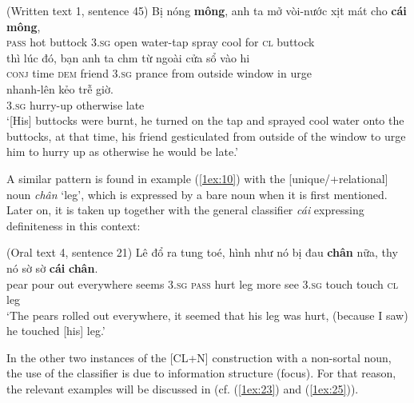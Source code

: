 \documentclass[output=paper]{langsci/langscibook}
\begin{document}
\begin{exe}
\ex\label{1ex:9}
(Written text 1, sentence 45)
\exi{}
\gll Bị         nóng   {\textbf{mông}},    {anh ta}  mở     vòi-nước    xịt      mát   cho   {\textbf{cái}}    {\textbf{mông}}, \\
{\textsc{pass}}   hot      buttock  {\textsc{3.sg}}    open   water-tap   spray cool  for     {\textsc{cl}}   buttock  \\
\glt 
\exi{}
\gll thì        lúc     đó,      bạn     {anh ta}   ch{\daob}m     từ      ngoài    {cửa sổ}    vào   h{\dao}i \\
{\textsc{conj}}  time   {\textsc{dem}}  friend  {\textsc{3.sg}}     prance   from outside  window  in     urge  \\
\glt 
\vspace*{-1mm}
\exi{} 
  nhanh-lên  kẻo           {trễ giờ}.  \\
3.{\textsc{sg}}    hurry-up    otherwise  late \\
\glt `[His] buttocks were burnt, he turned on the tap and sprayed cool water onto the buttocks, at that time, his friend gesticulated from outside of the window to urge him to hurry up as otherwise he would be late.'
\end{exe}

A similar pattern is found in example (\ref{1ex:10}) with the [\minus unique/+relational] noun {\emph{chân}} `leg', which is expressed by a bare noun when it is first mentioned. Later on, it is taken up together with the general classifier {\emph{cái}} expressing definiteness in this context:

\begin{exe}
\ex\label{1ex:10}
(Oral text 4, sentence 21) 
\exi{}
\gll Lê    đổ    ra    {tung toé},      {hình như}  nó     bị         đau   {\textbf{chân}}  nữa,   th{\daa}y  nó sờ       sờ       {\textbf{cái}}   {\textbf{chân}}. \\
pear pour out  everywhere seems       3.{\textsc{sg}}   {\textsc{pass}} hurt  leg     more  see   3.{\textsc{sg}} touch  touch  {\textsc{cl}}   leg \\
\glt `The pears rolled out everywhere, it seemed that his leg was hurt, (because I saw) he touched [his] leg.'
\end{exe}

{
In the other two instances of the [CL+N] construction with a non-sortal noun, the use of the classifier is due to information structure (focus). For that reason, the relevant examples will be discussed in  (cf. (\ref{1ex:23}) and (\ref{1ex:25})).
}
\end{document}
